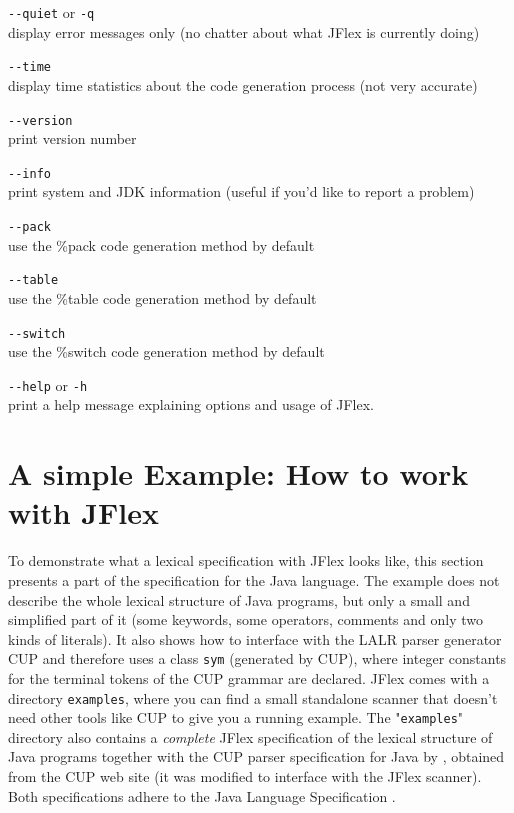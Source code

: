 \documentclass[11pt]{scrartcl}
\newcommand{\trit}{\em}
\begin{document}
\begin{description}
\item \verb+--quiet+ or \texttt{-q}\\
  display error messages only (no chatter about what JFlex is
  currently doing)

\item \verb+--time+\\
  display time statistics about the code generation process
  (not very accurate)

\item \verb+--version+\\
  print version number 

\item \verb+--info+\\
  print system and JDK information (useful if you'd like
  to report a problem)

\item \verb+--pack+\\
  use the \%pack code generation method by default

\item \verb+--table+\\
  use the \%table code generation method by default

\item \verb+--switch+\\
  use the \%switch code generation method by default

\item \verb+--help+ or \texttt{-h}\\
  print a help message explaining options and usage of JFlex.
\end{description}

\section{A simple Example: How to work with JFlex\label{Example}}
To demonstrate what a lexical specification with JFlex looks like, this
section presents a part of the specification for the Java language.
The example does not describe the whole lexical structure of Java programs,
but only a small and simplified part of it (some keywords, some operators,
comments and only two kinds of literals). It also shows how to interface
with the LALR parser generator CUP \cite{CUP} and therefore
uses a class \texttt{sym} (generated by CUP), where integer constants for
the terminal tokens of the CUP grammar are declared. JFlex comes with a
directory \texttt{examples}, where you can find a small standalone scanner
that doesn't need other tools like CUP to give you a running example.
The "\texttt{examples}" directory also contains a {\trit complete} JFlex 
specification of the lexical structure of Java programs together with the 
CUP parser specification for Java by 
, obtained
from the CUP \cite{CUP} web site (it was modified to interface with the JFlex scanner). 
Both specifications adhere to the Java Language Specification \cite{LangSpec}.
\end{document}
